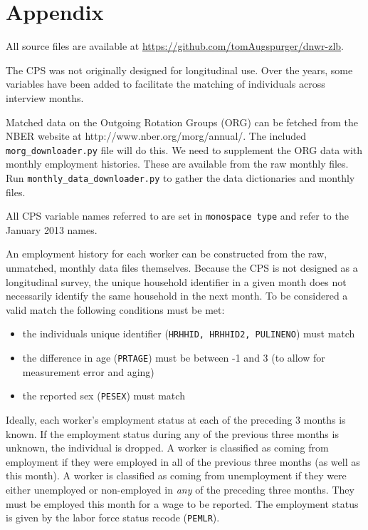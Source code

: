 \documentclass[11pt]{article}
\begin{document}
\newpage




\appendix
\section{Appendix}
\label{sec:appendix}

All source files are available at \href{https://github.com/tomAugspurger/dnwr-zlb}{https://github.com/tomAugspurger/dnwr-zlb}.

The CPS was not originally designed for longitudinal use.
Over the years, some variables have been added to facilitate the matching of individuals across interview months.

Matched data on the Outgoing Rotation Groups (ORG) can be fetched from the NBER website at http://www.nber.org/morg/annual/.
The included \texttt{morg\_downloader.py} file will do this.
We need to supplement the ORG data with monthly employment histories.
These are available from the raw monthly files.
Run \texttt{monthly\_data\_downloader.py} to gather the data dictionaries and monthly files.

All CPS variable names referred to are set in \texttt{monospace type} and refer to the January 2013 names.

An employment history for each worker can be constructed from the raw, unmatched, monthly data files themselves.
Because the CPS is not designed as a longitudinal survey, the unique household identifier in a given month does not necessarily identify the same household in the next month.
To be considered a valid match the following conditions must be met:

\begin{itemize}
    \item the individuals unique identifier (\texttt{HRHHID, HRHHID2, PULINENO}) must match
    \item the difference in age (\texttt{PRTAGE}) must be between -1 and 3 (to allow for measurement error and aging)
    \item the reported sex (\texttt{PESEX}) must match
\end{itemize}

Ideally, each worker's employment status at each of the preceding 3 months is known.
If the employment status during any of the previous three months is unknown, the individual is dropped.
A worker is classified as coming from employment if they were employed in all of the previous three months (as well as this month).
A worker is classified as coming from unemployment if they were either unemployed or non-employed in \emph{any} of the preceding three months.
They must be employed this month for a wage to be reported.
The employment status is given by the labor force status recode (\texttt{PEMLR}).
\end{document}
